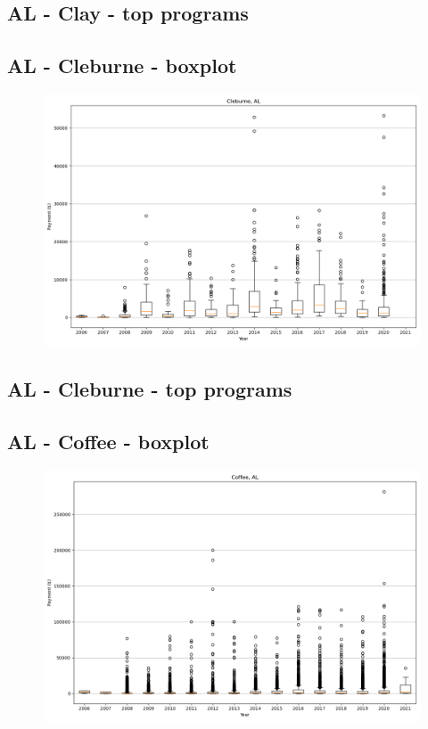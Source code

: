 \subsection*{AL - Clay - top programs}

\newpage
\subsection*{AL - Cleburne - boxplot}
\begin{figure}[h]
\centering
\includegraphics[width=7in]{../output/boxplots/counties/Cleburne-AL_boxplot.png}
\end{figure}


\subsection*{AL - Cleburne - top programs}

\newpage
\subsection*{AL - Coffee - boxplot}
\begin{figure}[h]
\centering
\includegraphics[width=7in]{../output/boxplots/counties/Coffee-AL_boxplot.png}
\end{figure}


